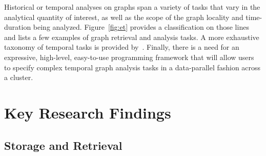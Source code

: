 \documentclass[graybox, natbib, nosecnum, twocolumn]{svmult}
\begin{document}
Historical or temporal analyses on graphs span a variety of tasks that vary in the analytical quantity of interest, as well as the scope of the graph locality and time-duration being analyzed. 
Figure~\ref{fig:et} provides a classification on those lines and lists a few examples of graph retrieval and analysis tasks.
A more exhaustive taxonomy of temporal tasks is provided by~\cite{ahn2014task}. 
Finally, there is a need for an expressive, high-level, easy-to-use programming framework that will allow users to 
specify complex temporal graph analysis tasks %
in a data-parallel fashion across a cluster.


\section{Key Research Findings}
\subsection{Storage and Retrieval}
\end{document}
